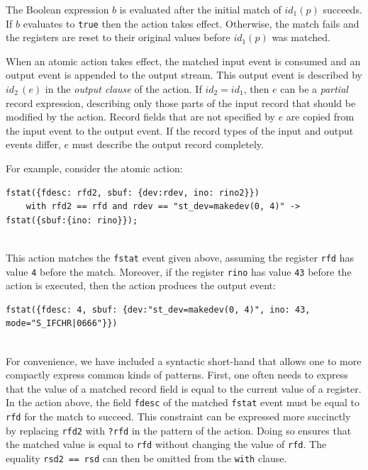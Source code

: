 The Boolean expression $b$ is evaluated after the initial match of $\mathit{id}_1(p)$ succeeds. If $b$ evaluates to \lstinline+true+ then the action takes effect. Otherwise, the match fails and the registers are reset to their original values before $\mathit{id}_1(p)$ was matched.

When an atomic action takes effect, the matched input event is consumed and an output event is appended to the output stream. This output event is described by $\mathit{id}_2\,(e)$ in the \emph{output clause} of the action. If $\mathit{id}_2=\mathit{id}_1$, then $e$ can be a \emph{partial} record expression, describing only those parts of the input record that should be modified by the action. Record fields that are not specified by $e$ are copied from the input event to the output event. If the record types of the input and output events differ, $e$ must describe the output record completely.

For example, consider the atomic action:
\\[.3em]
\begin{adjustbox}{max width=\textwidth}
\begin{lstlisting}[numbers=none,xleftmargin=0em,gobble=2,breaklines=false]
  fstat({fdesc: rfd2, sbuf: {dev:rdev, ino: rino2}})
    with rfd2 == rfd and rdev == "st_dev=makedev(0, 4)" -> fstat({sbuf:{ino: rino}});
    \end{lstlisting}
\end{adjustbox}\\[.5em]
This action matches the \lstinline+fstat+ event given above, assuming the register \lstinline+rfd+ has value \lstinline+4+ before the match. Moreover, if the register \lstinline+rino+ has value \lstinline+43+ before the action is executed, then the action produces the output event:
\\[.3em]
\begin{adjustbox}{max width=\textwidth}
\begin{lstlisting}[numbers=none,xleftmargin=0em,gobble=2,breaklines=false]
  fstat({fdesc: 4, sbuf: {dev:"st_dev=makedev(0, 4)", ino: 43, mode="S_IFCHR|0666"}})
  \end{lstlisting}
\end{adjustbox}\\[.5em]
For convenience, we have included a syntactic short-hand that allows one to more compactly express common kinds of patterns. First, one often needs to express that the value of a matched record field is equal to the current value of a register. In the action above, the field \lstinline+fdesc+ of the matched \lstinline+fstat+ event must be equal to \lstinline+rfd+ for the match to succeed. This constraint can be expressed more succinctly by replacing \lstinline+rfd2+ with \lstinline+?rfd+ in the pattern of the action. Doing so ensures that the matched value is equal to \lstinline+rfd+ without changing the value of \lstinline+rfd+. The equality \lstinline+rsd2 == rsd+ can then be omitted from the \lstinline+with+ clause.


